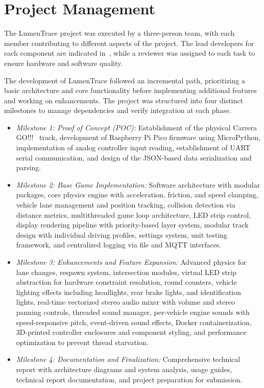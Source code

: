 \documentclass[10pt,journal,final,a4paper]{IEEEtran}
\begin{document}
\section{Project Management}
\label{sec:project-management}

The LumenTrace project was executed by a three-person team, with each member contributing to different aspects of the project. 
The lead developers for each component are indicated in~, while a reviewer was assigned to each task to ensure hardware and software quality. 

The development of LumenTrace followed an incremental path, prioritizing a basic architecture and core functionality before implementing additional features and working on enhancements. 
The project was structured into four distinct milestones to manage dependencies and verify integration at each phase.

\begin{itemize}
    \item \textit{Milestone 1: Proof of Concept (POC):}
          Establishment of the physical Carrera GO!!!~\cite{carrera:2026carrera} track, development of Raspberry Pi Pico firmware using MicroPython, implementation of analog controller input reading, establishment of UART serial communication, and design of the JSON-based data serialization and parsing.

    \item \textit{Milestone 2: Base Game Implementation:}
          Software architecture with modular packages, core physics engine with acceleration, friction, and speed clamping, vehicle lane management and position tracking, collision detection via distance metrics, multithreaded game loop architecture, LED strip control, display rendering pipeline with priority-based layer system, modular track design with individual driving profiles, settings system, unit testing framework, and centralized logging via file and MQTT interfaces.

    \item \textit{Milestone 3: Enhancements and Feature Expansion:}
          Advanced physics for lane changes, respawn system, intersection modules, virtual LED strip abstraction for hardware constraint resolution, round counters, vehicle lighting effects including headlights, rear brake lights, and identification lights, real-time vectorized stereo audio mixer with volume and stereo panning controls, threaded sound manager, per-vehicle engine sounds with speed-responsive pitch, event-driven sound effects, Docker containerization, 3D-printed controller enclosures and component styling, and performance optimization to prevent thread starvation.

    \item \textit{Milestone 4: Documentation and Finalization:}
          Comprehensive technical report with architecture diagrams and system analysis, usage guides, technical report documentation, and project preparation for submission.
\end{itemize}
\end{document}
